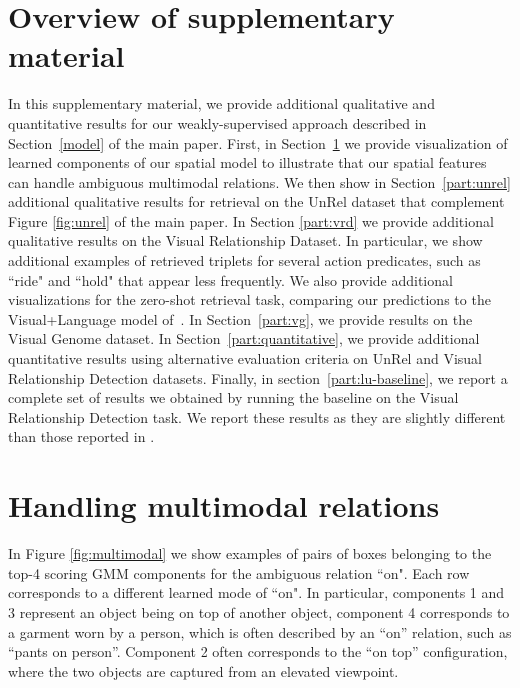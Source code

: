\documentclass[10pt,twocolumn,letterpaper]{article}
\begin{document}
{\small


}








\clearpage


\appendix






\section*{Overview of supplementary material}
In this supplementary material, we provide additional qualitative and quantitative results for our weakly-supervised approach described in Section~\ref{model} of the main paper. First, in Section~\ref{part:multimodal} we provide visualization of learned components of our spatial model to illustrate that our spatial features can handle ambiguous multimodal relations. We then show in Section~\ref{part:unrel} additional qualitative results for retrieval on the UnRel dataset that complement Figure \ref{fig:unrel} of the main paper. In Section \ref{part:vrd} we provide additional qualitative results on the Visual Relationship Dataset. In particular, we show additional examples of retrieved triplets for several action predicates, such as ``ride" and ``hold" that appear less frequently. We also provide additional visualizations for the zero-shot retrieval task, comparing our predictions to the Visual+Language model of~\cite{Lu16}. In Section~\ref{part:vg}, we provide results on the Visual Genome dataset. In Section~\ref{part:quantitative}, we provide additional quantitative results using alternative evaluation criteria  on UnRel and Visual Relationship Detection datasets. 
Finally, in section~\ref{part:lu-baseline}, we report a complete set of results we obtained by running the baseline \cite{Lu16} on the Visual Relationship Detection task. We report these results as they are slightly different than those reported in \cite{Lu16}.






\section{Handling multimodal relations}
\label{part:multimodal}
In Figure \ref{fig:multimodal} we show examples of pairs of boxes belonging to the top-4 scoring GMM components for the ambiguous relation ``on". Each row corresponds to a different learned mode of ``on". In particular, components 1 and 3 represent an object being on top of another object, component 4 corresponds to a garment worn by a person, which is often described by an ``on'' relation, such as ``pants on person''. Component 2 often corresponds to the ``on top'' configuration, where the two objects are captured from an elevated viewpoint. 
\end{document}
